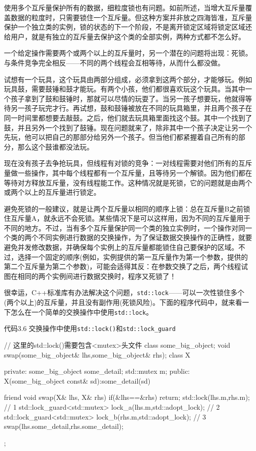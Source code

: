 使用多个互斥量保护所有的数据，细粒度锁也有问题。如前所述，当增大互斥量覆盖数据的粒度时，只需要锁住一个互斥量。但这种方案并非放之四海皆准，互斥量保护一个独立类的实例，锁的状态的下一个阶段，不是离开锁定区域将锁定区域还给用户，就是有独立的互斥量去保护这个类的全部实例，两种方式都不怎么好。

一个给定操作需要两个或两个以上的互斥量时，另一个潜在的问题将出现：死锁。与条件竞争完全相反——不同的两个线程会互相等待，从而什么都没做。


试想有一个玩具，这个玩具由两部分组成，必须拿到这两个部分，才能够玩。例如玩具鼓，需要鼓锤和鼓才能玩。有两个小孩，他们都很喜欢玩这个玩具。当其中一个孩子拿到了鼓和鼓锤时，那就可以尽情的玩耍了。当另一孩子想要玩，他就得等待另一孩子玩完才行。再试想，鼓和鼓锤被放在不同的玩具箱里，并且两个孩子在同一时间里都想要去敲鼓。之后，他们就去玩具箱里面找这个鼓。其中一个找到了鼓，并且另外一个找到了鼓锤。现在问题就来了，除非其中一个孩子决定让另一个先玩，他可以把自己的那部分给另外一个孩子。但当他们都紧握着自己所有的部分，那么这个鼓谁都没法玩。

现在没有孩子去争抢玩具，但线程有对锁的竞争：一对线程需要对他们所有的互斥量做一些操作，其中每个线程都有一个互斥量，且等待另一个解锁。因为他们都在等待对方释放互斥量，没有线程能工作。这种情况就是死锁，它的问题就是由两个或两个以上的互斥量进行锁定。

避免死锁的一般建议，就是让两个互斥量以相同的顺序上锁：总在互斥量B之前锁住互斥量A，就永远不会死锁。某些情况下是可以这样用，因为不同的互斥量用于不同的地方。不过，当有多个互斥量保护同一个类的独立实例时，一个操作对同一个类的两个不同实例进行数据的交换操作，为了保证数据交换操作的正确性，就要避免并发修改数据，并确保每个实例上的互斥量都能锁住自己要保护的区域。不过，选择一个固定的顺序(例如，实例提供的第一互斥量作为第一个参数，提供的第二个互斥量为第二个参数)，可能会适得其反：在参数交换了之后，两个线程试图在相同的两个实例间进行数据交换时，程序又死锁了！

很幸运，C++标准库有办法解决这个问题，\texttt{std::lock}——可以一次性锁住多个(两个以上)的互斥量，并且没有副作用(死锁风险)。下面的程序代码中，就来看一下怎么在一个简单的交换操作中使用\texttt{std::lock}。

代码3.6 交换操作中使用\texttt{std::lock()}和\texttt{std::lock\_guard}

\begin{cpp}
// 这里的std::lock()需要包含<mutex>头文件
class some_big_object;
void swap(some_big_object& lhs,some_big_object& rhs);
class X
{
private:
  some_big_object some_detail;
  std::mutex m;
public:
  X(some_big_object const& sd):some_detail(sd){}

  friend void swap(X& lhs, X& rhs)
  {
    if(&lhs==&rhs)
      return;
    std::lock(lhs.m,rhs.m); // 1
    std::lock_guard<std::mutex> lock_a(lhs.m,std::adopt_lock); // 2
    std::lock_guard<std::mutex> lock_b(rhs.m,std::adopt_lock); // 3
    swap(lhs.some_detail,rhs.some_detail);
  }
};
\end{cpp}

